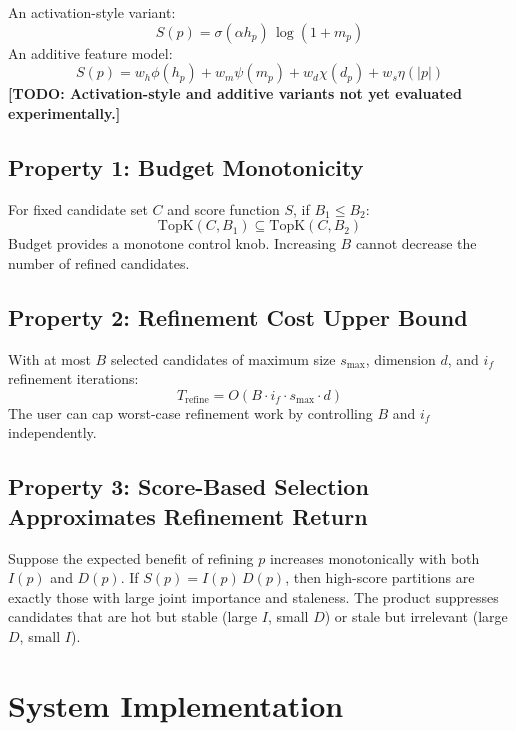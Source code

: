 \documentclass[sigconf, nonacm]{acmart}
\newcommand{\todo}[1]{\textbf{[TODO: #1]}}
\begin{document}
An activation-style variant:
\begin{equation}
  S(p) = \sigma(\alpha h_p)\,\log(1+m_p)
\end{equation}
An additive feature model:
\begin{equation}
  S(p) = w_h\phi(h_p) + w_m\psi(m_p) + w_d\chi(d_p) + w_s\eta(|p|)
\end{equation}
\todo{Activation-style and additive variants not yet evaluated experimentally.}

\subsection{Property 1: Budget Monotonicity}

For fixed candidate set $C$ and score function $S$, if $B_1 \leq B_2$:
\begin{equation}
  \mathrm{TopK}(C, B_1) \subseteq \mathrm{TopK}(C, B_2)
\end{equation}
Budget provides a monotone control knob. Increasing $B$ cannot
decrease the number of refined candidates.

\subsection{Property 2: Refinement Cost Upper Bound}

With at most $B$ selected candidates of maximum size $s_{\max}$,
dimension $d$, and $i_f$ refinement iterations:
\begin{equation}
  T_{\mathrm{refine}} = O(B \cdot i_f \cdot s_{\max} \cdot d)
\end{equation}
The user can cap worst-case refinement work by controlling $B$ and
$i_f$ independently.

\subsection{Property 3: Score-Based Selection Approximates Refinement Return}

Suppose the expected benefit of refining $p$ increases monotonically
with both $I(p)$ and $D(p)$. If $S(p) = I(p)\,D(p)$, then high-score
partitions are exactly those with large joint importance and staleness.
The product suppresses candidates that are hot but stable (large $I$,
small $D$) or stale but irrelevant (large $D$, small $I$).

\section{System Implementation}
\label{sec:implementation}
\end{document}
